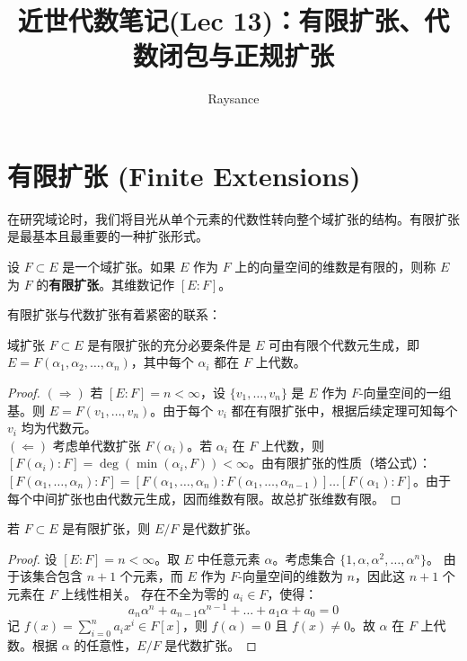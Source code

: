 \documentclass[11pt]{article}
\title{近世代数笔记(Lec 13)：有限扩张、代数闭包与正规扩张}
\author{Raysance}
\date{}
\begin{document}
\maketitle

\section{有限扩张 (Finite Extensions)}

在研究域论时，我们将目光从单个元素的代数性转向整个域扩张的结构。有限扩张是最基本且最重要的一种扩张形式。

\begin{cndefinition}[有限扩张]
    设 $F \subset E$ 是一个域扩张。如果 $E$ 作为 $F$ 上的向量空间的维数是有限的，则称 $E$ 为 $F$ 的\textbf{有限扩张}。其维数记作 $[E:F]$。
\end{cndefinition}

有限扩张与代数扩张有着紧密的联系：

\begin{cntheorem}
    域扩张 $F \subset E$ 是有限扩张的充分必要条件是 $E$ 可由有限个代数元生成，即 $E = F(\alpha_1, \alpha_2, \dots, \alpha_n)$，其中每个 $\alpha_i$ 都在 $F$ 上代数。
\end{cntheorem}

\begin{proof}
    $(\Rightarrow)$ 若 $[E:F] = n < \infty$，设 $\{v_1, \dots, v_n\}$ 是 $E$ 作为 $F$-向量空间的一组基。则 $E = F(v_1, \dots, v_n)$。由于每个 $v_i$ 都在有限扩张中，根据后续定理可知每个 $v_i$ 均为代数元。 \\
    $(\Leftarrow)$ 考虑单代数扩张 $F(\alpha_i)$。若 $\alpha_i$ 在 $F$ 上代数，则 $[F(\alpha_i) : F] = \deg(\min(\alpha_i, F)) < \infty$。由有限扩张的性质（塔公式）： $[F(\alpha_1, \dots, \alpha_n) : F] = [F(\alpha_1, \dots, \alpha_n) : F(\alpha_1, \dots, \alpha_{n-1})] \dots [F(\alpha_1) : F]$。由于每个中间扩张也由代数元生成，因而维数有限。故总扩张维数有限。
\end{proof}

\begin{cntheorem}
    若 $F \subset E$ 是有限扩张，则 $E/F$ 是代数扩张。
\end{cntheorem}

\begin{proof}
    设 $[E:F] = n < \infty$。取 $E$ 中任意元素 $\alpha$。考虑集合 $\{1, \alpha, \alpha^2, \dots, \alpha^n\}$。
    由于该集合包含 $n+1$ 个元素，而 $E$ 作为 $F$-向量空间的维数为 $n$，因此这 $n+1$ 个元素在 $F$ 上线性相关。
    存在不全为零的 $a_i \in F$，使得：
    \[ a_n \alpha^n + a_{n-1} \alpha^{n-1} + \dots + a_1 \alpha + a_0 = 0 \]
    记 $f(x) = \sum_{i=0}^n a_i x^i \in F[x]$，则 $f(\alpha) = 0$ 且 $f(x) \neq 0$。故 $\alpha$ 在 $F$ 上代数。根据 $\alpha$ 的任意性，$E/F$ 是代数扩张。
\end{proof}
\end{document}
